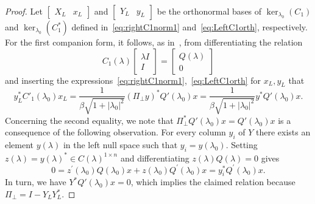 \documentclass[12pt]{article}
\begin{document}
\begin{proof}
Let $\begin{bmatrix}
    X_L & x_L
\end{bmatrix}$ and $\begin{bmatrix}
    Y_L & y_L
\end{bmatrix}$ be the orthonormal bases of $\ker_{\lambda_0}(C_1)$ and $\ker_{\lambda_0}(C_1^*)$
defined in~\eqref{eq:rightC1norm1} and~\eqref{eq:LeftC1orth}, respectively. 
For the first companion form, it follows, as in~\cite{higham2006conditioning}, from differentiating the relation \begin{equation} \label{eq:linrelation}
C_1(\lambda) \begin{bmatrix}
\lambda I \\
I
\end{bmatrix} = 
\begin{bmatrix}
Q(\lambda) \\
0
\end{bmatrix}
\end{equation}
 and inserting the expressions~\eqref{eq:rightC1norm1},~\eqref{eq:LeftC1orth} for $x_L,y_L$  that
\begin{equation} \label{eq:expressionlincondnumber}
y_L^*C'_1(\lambda_0)x_L = 
\frac{1}{\beta\sqrt{1+|\lambda_0|^2}} (\Pi_\perp y)^* Q'(\lambda_0)x = \frac{1}{\beta\sqrt{1+|\lambda_0|^2}} y^*Q'(\lambda_0)x.
\end{equation}
Concerning the second equality, we note that $\Pi_\perp^* Q'(\lambda_0)x = Q'(\lambda_0)x$ is a consequence of the following observation. For every column $y_i$ of $Y$ there exists an element $y(\lambda)$ in the left null space such that 
$y_i = y(\lambda_0)$. Setting $z(\lambda) = y(\lambda)^* \in C(\lambda)^{1\times n}$
and differentiating $z(\lambda) Q(\lambda) = 0$ gives \[
0 = z^\prime(\lambda_0) Q(\lambda_0)x  + z(\lambda_0) Q^\prime(\lambda_0) x = y_i^* Q^\prime(\lambda_0) x.
\]
In turn, we have $Y^* Q'(\lambda_0)x = 0$, which implies the claimed relation because $\Pi_\perp = I-Y_LY_L^*$.


\end{proof}
\end{document}
